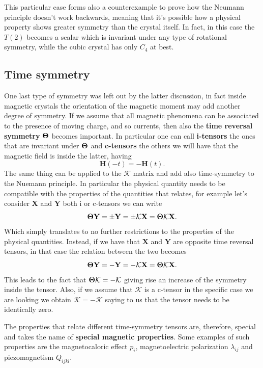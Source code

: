 \nt
{
    This particular case forms also a counterexample to prove how the Neumann principle doesn't work backwards, meaning that it's possible how a physical property shows greater symmetry than the crystal itself. In fact, in this case the $T(2)$ becomes a scalar which is invariant under any type of rotational symmetry, while the cubic crystal has only $C_4$ at best.
}

\subsection{Time symmetry}

One last type of symmetry was left out by the latter discussion, in fact inside magnetic crystals the orientation of the magnetic moment may add another degree of symmetry. If we assume that all magnetic phenomena can be associated to the presence of moving charge, and so currents, then also the \textbf{time reversal symmetry} $\vb*{\Theta}$ becomes important. In particular one can call \textbf{i-tensors} the ones that are invariant under $\vb*{\Theta}$ and \textbf{c-tensors} the others we will have that the magnetic field is inside the latter, having
\begin{equation}
    \mathbf{H}(-t) = -\mathbf{H}(t).
\end{equation} 
The same thing can be applied to the $\mathcal{K}$ matrix and add also time-symmetry to the Nuemann principle. In particular the physical quantity needs to be compatible with the properties of the quantities that relates, for example let's consider $\mathbf{X}$ and $\mathbf{Y}$ both i or c-tensors we can write
\begin{equation}
    \vb*{\Theta}\mathbf{Y} = \pm\mathbf{Y} = \pm\mathcal{K}\mathbf{X} = \vb*{\Theta}\mathcal{K}\mathbf{X}.
\end{equation}
Which simply translates to no further restrictions to the properties of the physical quantities. Instead, if we have that $\mathbf{X}$ and $\mathbf{Y}$ are opposite time reversal tensors, in that case the relation between the two becomes
\begin{equation}
    \vb*{\Theta}\mathbf{Y} = -\mathbf{Y} = -\mathcal{K}\mathbf{X} = \vb*{\Theta}\mathcal{K}\mathbf{X}.
\end{equation}
This leads to the fact that $\vb*{\Theta}\mathcal{K} = -\mathcal{K}$ giving rise an increase of the symmetry inside the tensor. Also, if we assume that $\mathcal{K}$ is a c-tensor in the specific case we are looking we obtain $\mathcal{K} = -\mathcal{K}$ saying to us that the tensor needs to be identically zero.

The properties that relate different time-symmetry tensors are, therefore, special and takes the name of \textbf{special magnetic properties}. Some examples of such properties are the magnetocaloric effect $p_i$, magnetoelectric polarization $\lambda_{ij}$ and piezomagnetism $Q_{ijkl}$.